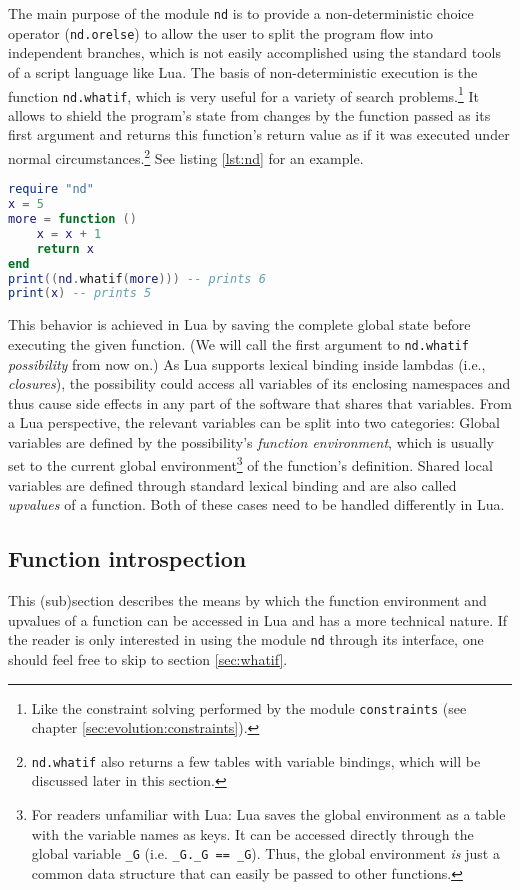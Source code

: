 The main purpose of the module \texttt{nd} is to provide a non-deterministic choice operator (\texttt{nd.orelse}) to allow the user to split the program flow into independent branches, which is not easily accomplished using the standard tools of a script language like Lua. The basis of non-deterministic execution is the function \texttt{nd.whatif}, which is very useful for a variety of search problems.\footnote{Like the constraint solving performed by the module \texttt{constraints} (see chapter \ref{sec:evolution:constraints}).} It allows to shield the program's state from changes by the function passed as its first argument and returns this function's return value as if it was executed under normal circumstances.\footnote{\texttt{nd.whatif} also returns a few tables with variable bindings, which will be discussed later in this section.} See listing \ref{lst:nd} for an example.

\begin{lstlisting}[language=lua, caption={Preventing global changes with \texttt{nd.whatif}}, label=lst:nd, name=lst:nd]
require "nd"
x = 5
more = function ()
	x = x + 1
	return x
end
print((nd.whatif(more))) -- prints 6
print(x) -- prints 5
\end{lstlisting}

This behavior is achieved in Lua by saving the complete global state before executing the given function. (We will call the first argument to \texttt{nd.whatif} \emph{possibility} from now on.) As Lua supports lexical binding inside lambdas (i.e., \emph{closures}), the possibility could access all variables of its enclosing namespaces and thus cause side effects in any part of the software that shares that variables. From a Lua perspective, the relevant variables can be split into two categories: Global variables are defined by the possibility's \emph{function environment}, which is usually set to the current global environment\footnote{For readers unfamiliar with Lua: Lua saves the global environment as a table with the variable names as keys. It can be accessed directly through the global variable \texttt{\_G} (i.e. \texttt{\_G.\_G == \_G}). Thus, the global environment \emph{is} just a common data structure that can easily be passed to other functions.} of the function's definition. Shared local variables are defined through standard lexical binding and are also called \emph{upvalues} of a function. Both of these cases need to be handled differently in Lua.

\subsection{Function introspection}
This (sub)section describes the means by which the function environment and upvalues of a function can be accessed in Lua and has a more technical nature. If the reader is only interested in using the module \texttt{nd} through its interface, one should feel free to skip to section \ref{sec:whatif}.

